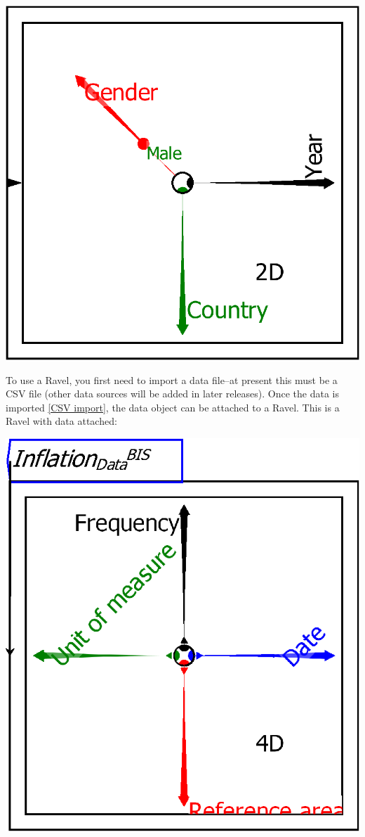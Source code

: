 \includegraphics{images/RavelBlank}

To use a Ravel, you first need to import a data file--at present
this must be a CSV file (other data sources will be added in later
releases). Once the data is imported \ref{CSV import}, the data object
can be attached to a Ravel. This is a Ravel with data attached:
\begin{flushleft}
\includegraphics{images/01RavelDataInflation} 
\par\end{flushleft}

